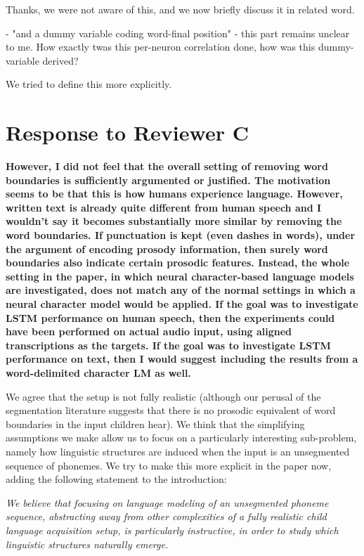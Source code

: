 \documentclass{article}[11pt,a4paper,oneside]
\begin{document}
Thanks, we were not aware of this, and we now briefly discuss it in related word.

- "and a dummy variable coding word-final position" - this part remains
unclear to me. How exactly twas this per-neuron correlation done, how was
this dummy-variable derived?

We tried to define this more explicitly.

\section{Response to Reviewer C}

\textbf{However, I did not feel that the overall setting of removing word boundaries
is sufficiently argumented or justified. The motivation seems to be that
this is how humans experience language. However, written text is already
quite different from human speech and I wouldn't say it becomes
substantially more similar by removing the word boundaries. If punctuation
is kept (even dashes in words), under the argument of encoding prosody
information, then surely word boundaries also indicate certain prosodic
features. Instead, the whole setting in the paper, in which neural
character-based language models are investigated, does not match any of the
normal settings in which a neural character model would be applied. If the
goal was to investigate LSTM performance on human speech, then the
experiments could have been performed on actual audio input, using aligned
transcriptions as the targets. If the goal was to investigate LSTM
performance on text, then I would suggest including the results from a
word-delimited character LM as well.}

We agree that the setup is not fully realistic (although our perusal of the segmentation literature suggests that there is no prosodic equivalent of word boundaries in the input children hear). We think that the simplifying assumptions we make allow us to focus on a particularly interesting sub-problem, namely how linguistic structures are induced when the input is an unsegmented sequence of phonemes. We try to make this more explicit in the paper now, adding the following statement to the introduction:

\textit{We believe that focusing on language modeling of an unsegmented phoneme sequence, abstracting away from other complexities of a fully realistic child language acquisition setup, is particularly instructive, in order to study which linguistic structures naturally emerge.}\newline
\end{document}
